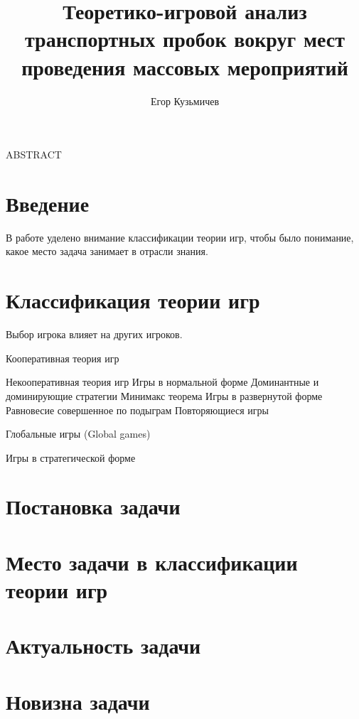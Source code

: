 \documentclass[]{report}
\author{Егор Кузьмичев}
\title{Теоретико-игровой анализ транспортных пробок вокруг мест проведения массовых мероприятий}
\begin{document}
\maketitle

ABSTRACT

\tableofcontents


\section{Введение}

В работе уделено внимание классификации теории игр, чтобы было понимание, какое место задача занимает в отрасли знания.

\section{Классификация теории игр}

Выбор игрока влияет на других игроков.



Кооперативная теория игр

Некооперативная теория игр
Игры в нормальной форме
Доминантные и доминирующие стратегии
Минимакс теорема
Игры в развернутой форме
Равновесие совершенное по подыграм
Повторяющиеся игры

Глобальные игры (Global games)

Игры в стратегической форме


\section{Постановка задачи}

\section{Место задачи в классификации теории игр}

\section{Актуальность задачи}

\section{Новизна задачи}
\end{document}
